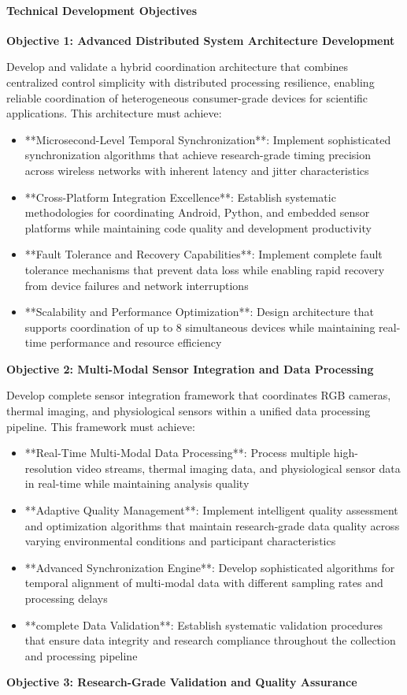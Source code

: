 \documentclass[11pt,a4paper]{article}
\begin{document}
\paragraph{Technical Development Objectives}

\textbf{Objective 1: Advanced Distributed System Architecture Development}

Develop and validate a hybrid coordination architecture that combines centralized
control simplicity with distributed
processing resilience, enabling reliable coordination of heterogeneous consumer-grade
devices for scientific
applications. This architecture must achieve:

\begin{itemize}
\item **Microsecond-Level Temporal Synchronization**: Implement sophisticated synchronization algorithms that achieve
  research-grade timing precision across wireless networks with inherent latency and
  jitter characteristics
\item **Cross-Platform Integration Excellence**: Establish systematic methodologies for coordinating Android, Python, and
  embedded sensor platforms while maintaining code quality and development productivity
\item **Fault Tolerance and Recovery Capabilities**: Implement complete fault tolerance mechanisms that prevent data
  loss while enabling rapid recovery from device failures and network interruptions
\item **Scalability and Performance Optimization**: Design architecture that supports coordination of up to 8 simultaneous
  devices while maintaining real-time performance and resource efficiency

\end{itemize}
\textbf{Objective 2: Multi-Modal Sensor Integration and Data Processing}

Develop complete sensor integration framework that coordinates RGB cameras, thermal
imaging, and physiological
sensors within a unified data processing pipeline. This framework must achieve:

\begin{itemize}
\item **Real-Time Multi-Modal Data Processing**: Process multiple high-resolution video streams, thermal imaging data, and
  physiological sensor data in real-time while maintaining analysis quality
\item **Adaptive Quality Management**: Implement intelligent quality assessment and optimization algorithms that maintain
  research-grade data quality across varying environmental conditions and participant
  characteristics
\item **Advanced Synchronization Engine**: Develop sophisticated algorithms for temporal alignment of multi-modal data with
  different sampling rates and processing delays
\item **complete Data Validation**: Establish systematic validation procedures that ensure data integrity and research
  compliance throughout the collection and processing pipeline

\end{itemize}
\textbf{Objective 3: Research-Grade Validation and Quality Assurance}
\end{document}
